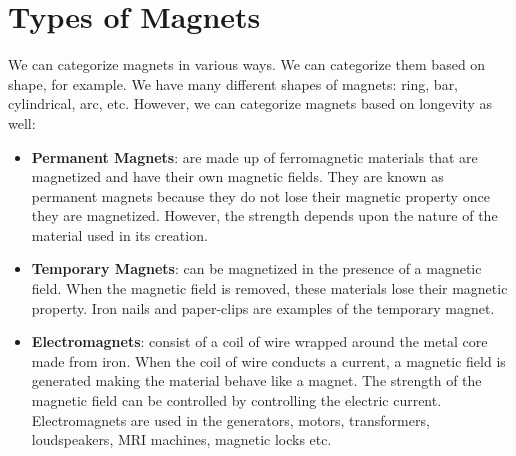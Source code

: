 \documentclass[9pt]{article}
\begin{document}
	\section*{Types of Magnets}
	We can categorize magnets in various ways. We can categorize them based on shape, for example. We have many different shapes of magnets: ring, bar, cylindrical, arc, etc. However, we can categorize magnets based on longevity as well:
	\begin{itemize}
		\item \textbf{Permanent Magnets}: are made up of ferromagnetic materials that are magnetized and have their own magnetic fields.	They are known as permanent magnets because they do not lose their magnetic property once they are magnetized. However, the strength depends upon the nature of the material used in its creation.
		\item \textbf{Temporary Magnets}: can be magnetized in the presence of a magnetic field. When the magnetic field is removed, these materials lose their magnetic property. Iron nails and paper-clips are examples of the temporary magnet.
		\item \textbf{Electromagnets}: consist of a coil of wire wrapped around the metal core made from iron. When the coil of wire conducts a current, a magnetic field is generated making the material behave like a magnet. The strength of the magnetic field can be controlled by controlling the electric current. Electromagnets are used in the generators, motors, transformers, loudspeakers, MRI machines, magnetic locks etc.
	\end{itemize}
\end{document}
